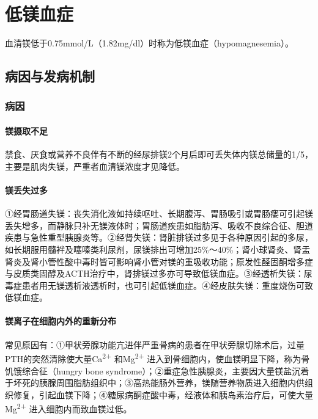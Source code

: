 \section{低镁血症}

血清镁低于0.75mmol/L（1.82mg/dl）时称为低镁血症（hypomagnesemia）。

\subsection{病因与发病机制}

\subsubsection{病因}

\paragraph{镁摄取不足}

禁食、厌食或营养不良伴有不断的经尿排镁2个月后即可丢失体内镁总储量的1/5，主要是肌肉失镁，严重者血清镁浓度才见降低。

\paragraph{镁丢失过多}

①经胃肠道失镁：丧失消化液如持续呕吐、长期腹泻、胃肠吸引或胃肠瘘可引起镁丢失增多，而静脉只补无镁液体时；胃肠道疾患如脂肪泻、吸收不良综合征、胆道疾患与急性重型胰腺炎等。②经肾失镁：肾脏排镁过多见于各种原因引起的多尿，如长期服用髓袢及噻嗪类利尿剂，尿镁排出可增加25\%～40\%；肾小球肾炎、肾盂肾炎及肾小管性酸中毒时皆可影响肾小管对镁的重吸收功能；原发性醛固酮增多症与皮质类固醇及ACTH治疗中，肾排镁过多亦可导致低镁血症。③经透析失镁：尿毒症患者用无镁透析液透析时，也可引起低镁血症。④经皮肤失镁：重度烧伤可致低镁血症。

\paragraph{镁离子在细胞内外的重新分布}

常见原因有：①甲状旁腺功能亢进伴严重骨病的患者在甲状旁腺切除术后，过量PTH的突然清除使大量Ca\textsuperscript{2+}
和Mg\textsuperscript{2+}
进入到骨细胞内，使血镁明显下降，称为骨饥饿综合征（hungry bone
syndrome）；②重症急性胰腺炎，主要因大量镁盐沉着于坏死的胰腺周围脂肪组织中；③高热能肠外营养，镁随营养物质进入细胞内供组织修复，引起血镁下降；④糖尿病酮症酸中毒，经液体和胰岛素治疗后，可使大量Mg\textsuperscript{2+}
进入细胞内而致血镁过低。

